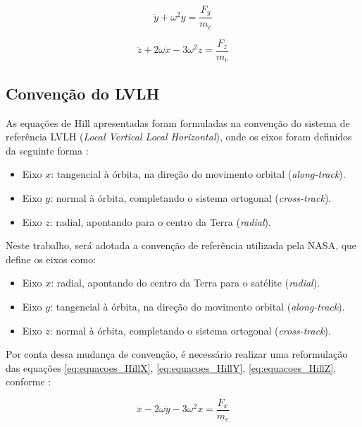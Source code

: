 \begin{equation}
    \label{eq:equacoes_HillY}
\ddot{y} + \omega^2 y = \frac{F_y}{m_c}
\end{equation}

\begin{equation}
    \label{eq:equacoes_HillZ}
\ddot{z} + 2\omega \dot{x} - 3 \omega^2 z = \frac{F_z}{m_c}
\end{equation}


\subsection{Convenção do LVLH}

As equações de Hill apresentadas foram formuladas na convenção do sistema de referência LVLH (\emph{Local Vertical Local Horizontal}), onde os eixos foram definidos da seguinte forma \cite{fehse2003}:
\begin{itemize}
    \item Eixo $x$: tangencial à órbita, na direção do movimento orbital (\emph{along-track}).
    \item Eixo $y$: normal à órbita, completando o sistema ortogonal  (\emph{cross-track}).
    \item Eixo $z$: radial, apontando para o centro da Terra  (\emph{radial}).
\end{itemize}

Neste trabalho, será adotada a convenção de referência utilizada pela NASA, que define os eixos como:

\begin{itemize}
    \item Eixo $x$: radial, apontando do centro da Terra para o satélite (\emph{radial}).
    \item Eixo $y$: tangencial à órbita, na direção do movimento orbital  (\emph{along-track}).
    \item Eixo $z$: normal à órbita, completando o sistema ortogonal  (\emph{cross-track}).
\end{itemize}

Por conta dessa mudança de convenção, é necessário realizar uma reformulação das equações \eqref{eq:equacoes_HillX}, \eqref{eq:equacoes_HillY}, \eqref{eq:equacoes_HillZ}, conforme \cite{sidi1997spacecraft}:

\begin{equation}
    \label{eq:Hill_NASA_X}
    \ddot{x} - 2\omega \dot{y} - 3\omega^2 x = \frac{F_x}{m_c}
\end{equation}

